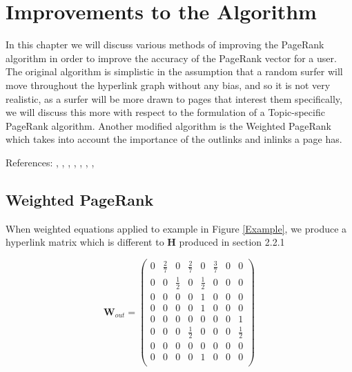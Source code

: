\documentclass[11pt]{report}
\begin{document}
\chapter{Improvements to the Algorithm}

In this chapter we will discuss various methods of improving the PageRank algorithm in order to improve the accuracy of the PageRank vector for a user. The original algorithm is simplistic in the assumption that a random surfer will move throughout the hyperlink graph without any bias, and so it is not very realistic, as a surfer will be more drawn to pages that interest them specifically, we will discuss this more with respect to the formulation of a Topic-specific PageRank algorithm. Another modified algorithm is the Weighted PageRank which takes into account the importance of the outlinks and inlinks a page has.

References: \cite{baeza2004web}, \cite{bonato}, , \cite{langville}, \cite{manning}, \cite{stata2000term}, \cite{thorson2004modeling}, \cite{tomlin2003new} 

\section{Weighted PageRank}\label{sec:weighted} \cite{xing2004weighted}

When weighted equations applied to example in Figure \ref{Example}, we produce a hyperlink matrix which is different to \textbf{H} produced in section 2.2.1 

\[\textbf{W}_{out}=\left(
\begin{array}{cccccccc}
0 & \frac{2}{7} & 0 & \frac{2}{7} & 0 &\frac{3}{7} & 0 & 0 \\
0 & 0 &\frac{1}{2}& 0 &\frac{1}{2}& 0 & 0 & 0\\
0 & 0 & 0 & 0 & 1 & 0 & 0 & 0\\
0 & 0 & 0 & 0 & 1 & 0 & 0 & 0\\
0 & 0 & 0 & 0 & 0 & 0 & 0 & 1\\
0 & 0 & 0 & \frac{1}{2} & 0 & 0 & 0 & \frac{1}{2} \\
0 & 0 & 0 & 0 & 0 & 0 & 0 & 0\\
0 & 0 & 0 & 0 & 1 & 0 & 0 & 0\\
\end{array}
\right)	\]
\end{document}
